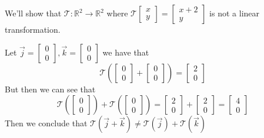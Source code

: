 \documentclass[notoc,notitlepage]{tufte-book}
\newcommand\mat[1]{\begin{bmatrix}#1\end{bmatrix}}
\begin{document}
\begin{eg}
    We'll show that $\mathcal{T} : \mathbb{R}^2 \to \mathbb{R}^2 $ where
    $\mathcal{T} \mat{ x \\ y } = \mat{ x + 2 \\ y }$ is not a linear
    transformation.

    Let $\vec{j} = \mat{ 0 \\ 0 }, \vec{k} = \mat{ 0 \\ 0 }$ we have that
    \begin{equation*}
        \mathcal{T}(\mat{ 0 \\ 0 } + \mat{ 0 \\ 0 }) = \mat{ 2 \\ 0 }       
    \end{equation*}
    But then we can see that 
    \begin{equation*}
        \mathcal{T}(\mat{ 0 \\ 0 }) + \mathcal{T}(\mat{ 0 \\ 0 }) = \mat{ 2 \\ 0
        } + \mat{ 2 \\ 0 } = \mat{ 4 \\ 0 }         
    \end{equation*}
    Then we conclude that $\mathcal{T}(\vec{j} + \vec{k}) \neq
    \mathcal{T}(\vec{j}) + \mathcal{T}(\vec{k})$ 
\end{eg}
\end{document}
